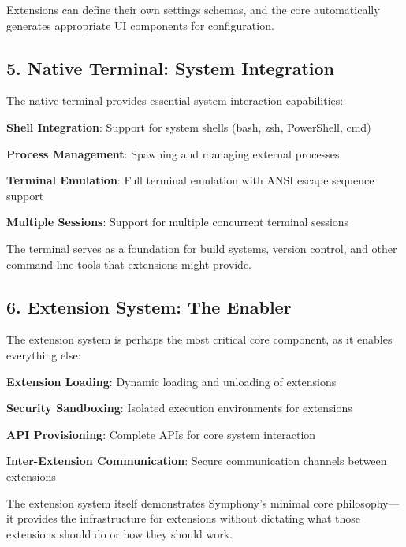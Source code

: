 Extensions can define their own settings schemas, and the core automatically generates appropriate UI components for configuration.

\subsection*{5. Native Terminal: System Integration}

The native terminal provides essential system interaction capabilities:

\begin{compactlist}
    \item \textbf{Shell Integration}: Support for system shells (bash, zsh, PowerShell, cmd)
    \item \textbf{Process Management}: Spawning and managing external processes
    \item \textbf{Terminal Emulation}: Full terminal emulation with ANSI escape sequence support
    \item \textbf{Multiple Sessions}: Support for multiple concurrent terminal sessions
\end{compactlist}

The terminal serves as a foundation for build systems, version control, and other command-line tools that extensions might provide.

\subsection*{6. Extension System: The Enabler}

The extension system is perhaps the most critical core component, as it enables everything else:

\begin{compactlist}
    \item \textbf{Extension Loading}: Dynamic loading and unloading of extensions
    \item \textbf{Security Sandboxing}: Isolated execution environments for extensions
    \item \textbf{API Provisioning}: Complete APIs for core system interaction
    \item \textbf{Inter-Extension Communication}: Secure communication channels between extensions
\end{compactlist}

\begin{alertbox}
The extension system itself demonstrates Symphony's minimal core philosophy—it provides the infrastructure for extensions without dictating what those extensions should do or how they should work.
\end{alertbox}


